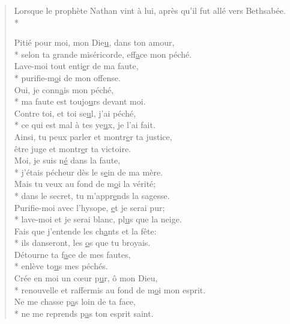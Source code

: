 
\begin{verse}
Lorsque le prophète Nathan vint à lui, après qu’il fut allé vers Bethsabée. \\*

Pitié pour moi, mon Die\underline{u}, dans ton amour, \\*
selon ta grande miséricorde, eff\underline{a}ce mon péché. \\
Lave-moi tout enti\underline{e}r de ma faute, \\*
purifie-m\underline{o}i de mon offense. \\

Oui, je conn\underline{a}is mon péché, \\*
ma faute est toujo\underline{u}rs devant moi. \\
Contre toi, et toi se\underline{u}l, j’ai péché, \\*
ce qui est mal à tes ye\underline{u}x, je l’ai fait. \\

Ainsi, tu peux parler et montr\underline{e}r ta justice, \\
être juge et montr\underline{e}r ta victoire. \\
Moi, je suis n\underline{é} dans la faute, \\*
j’étais pécheur dès le s\underline{e}in de ma mère. \\

Mais tu veux au fond de m\underline{o}i la vérité; \\*
dans le secret, tu m’appr\underline{e}nds la sagesse. \\
Purifie-moi avec l’hysope, \underline{e}t je serai pur; \\*
lave-moi et je serai blanc, pl\underline{u}s que la neige. \\

Fais que j’entende les ch\underline{a}nts et la fête: \\*
ils danseront, les \underline{o}s que tu broyais. \\
Détourne ta f\underline{a}ce de mes fautes, \\*
enlève to\underline{u}s mes péchés. \\

Crée en moi un cœur p\underline{u}r, ô mon Dieu, \\*
renouvelle et raffermis au fond de m\underline{o}i mon esprit. \\
Ne me chasse p\underline{a}s loin de ta face, \\*
ne me reprends p\underline{a}s ton esprit saint. \\


\end{verse}
